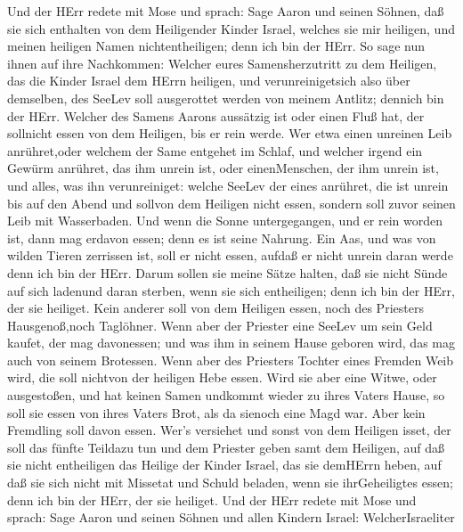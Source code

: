  Und der HErr redete mit Mose und sprach:  Sage
Aaron und seinen Söhnen, daß sie sich enthalten von dem Heiligender
Kinder Israel, welches sie mir heiligen, und meinen heiligen Namen
nichtentheiligen; denn ich bin der HErr.  So sage nun ihnen
auf ihre Nachkommen: Welcher eures Samensherzutritt zu dem Heiligen, das
die Kinder Israel dem HErrn heiligen, und verunreinigetsich also über
demselben, des SeeLev soll ausgerottet werden von meinem Antlitz;
dennich bin der HErr.  Welcher des Samens Aarons aussätzig
ist oder einen Fluß hat, der sollnicht essen von dem Heiligen, bis er
rein werde. Wer etwa einen unreinen Leib anrühret,oder welchem der Same
entgehet im Schlaf,  und welcher irgend ein Gewürm anrühret,
das ihm unrein ist, oder einenMenschen, der ihm unrein ist, und alles,
was ihn verunreiniget:  welche SeeLev der eines anrühret,
die ist unrein bis auf den Abend und sollvon dem Heiligen nicht essen,
sondern soll zuvor seinen Leib mit Wasserbaden.  Und wenn
die Sonne untergegangen, und er rein worden ist, dann mag erdavon essen;
denn es ist seine Nahrung.  Ein Aas, und was von wilden
Tieren zerrissen ist, soll er nicht essen, aufdaß er nicht unrein daran
werde denn ich bin der HErr.  Darum sollen sie meine Sätze
halten, daß sie nicht Sünde auf sich ladenund daran sterben, wenn sie
sich entheiligen; denn ich bin der HErr, der sie heiliget. 
Kein anderer soll von dem Heiligen essen, noch des Priesters
Hausgenoß,noch Taglöhner.  Wenn aber der Priester eine
SeeLev um sein Geld kaufet, der mag davonessen; und was ihm in seinem
Hause geboren wird, das mag auch von seinem Brotessen. 
Wenn aber des Priesters Tochter eines Fremden Weib wird, die soll
nichtvon der heiligen Hebe essen.  Wird sie aber eine
Witwe, oder ausgestoßen, und hat keinen Samen undkommt wieder zu ihres
Vaters Hause, so soll sie essen von ihres Vaters Brot, als da sienoch
eine Magd war. Aber kein Fremdling soll davon essen.  Wer's
versiehet und sonst von dem Heiligen isset, der soll das fünfte Teildazu
tun und dem Priester geben samt dem Heiligen,  auf daß sie
nicht entheiligen das Heilige der Kinder Israel, das sie demHErrn heben,
 auf daß sie sich nicht mit Missetat und Schuld beladen,
wenn sie ihrGeheiligtes essen; denn ich bin der HErr, der sie heiliget.
 Und der HErr redete mit Mose und sprach: 
Sage Aaron und seinen Söhnen und allen Kindern Israel: WelcherIsraeliter
